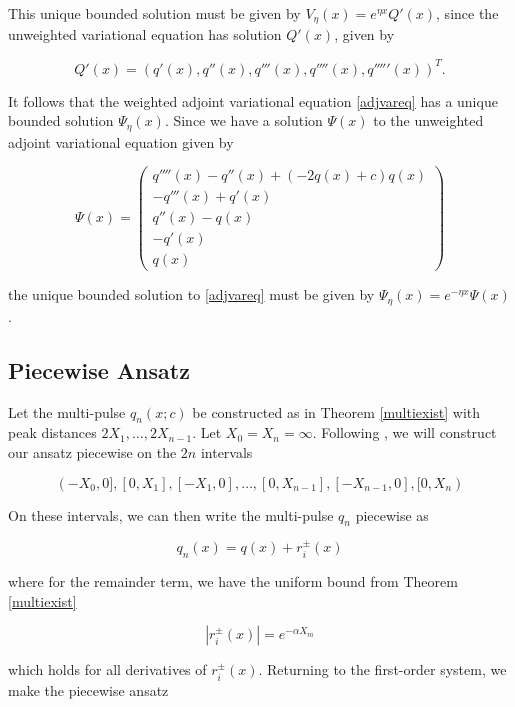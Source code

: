 \documentclass[12pt]{article}
\begin{document}
This unique bounded solution must be given by $V_\eta(x) = e^{\eta x} Q'(x)$, since the unweighted  variational equation has solution $Q'(x)$, given by

\begin{equation}
Q'(x) = (q'(x), q''(x), q'''(x), q''''(x), q'''''(x))^T.
\end{equation}

It follows that the weighted adjoint variational equation \eqref{adjvareq} has a unique bounded solution $\Psi_\eta(x)$. Since we have a solution $\Psi(x)$ to the unweighted adjoint variational equation given by

\begin{equation}\label{Psi}
\Psi(x) = \begin{pmatrix}
q''''(x) - q''(x) + (-2q(x) + c)q(x)\\
-q'''(x) + q'(x) \\
q''(x) - q(x) \\
-q'(x) \\
q(x)
\end{pmatrix}
\end{equation}

the unique bounded solution to \eqref{adjvareq} must be given by $\Psi_\eta(x) = e^{-\eta x}\Psi(x)$.

\subsection{Piecewise Ansatz}

Let the multi-pulse $q_n(x; c)$ be constructed as in Theorem \ref{multiexist} with peak distances $2 X_1, \dots, 2 X_{n-1}$. Let $X_0 = X_n = \infty$. Following \cite{Sandstede1998}, we will construct our ansatz piecewise on the $2n$ intervals

\[
(-X_0, 0], [0, X_1], [-X_1, 0], \dots, [0, X_{n-1}], [-X_{n-1}, 0], [0, X_n) 
\]

On these intervals, we can then write the multi-pulse $q_n$ piecewise as

\[
q_n(x) = q(x) + r_i^\pm(x)
\]

where for the remainder term, we have the uniform bound from Theorem \ref{multiexist}

\begin{equation}\label{ripmbound}
|r_i^\pm(x)| = e^{-\alpha X_m} 
\end{equation}

which holds for all derivatives of $r_i^\pm(x)$. Returning to the first-order system, we make the piecewise ansatz 
\end{document}
